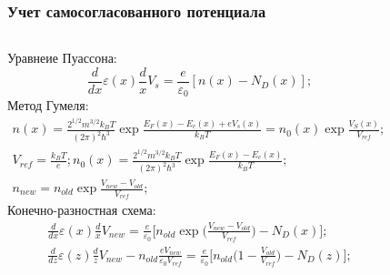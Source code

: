 \documentclass[10pt,pdf,hyperref={unicode},aspectratio={169}]{beamer}
\begin{document}
\begin{frame}
	\frametitle{Учет самосогласованного потенциала}

\begin{columns}
	{\color{blue}Уравнеие Пуассона:}
	{\tiny
	\begin{equation*}
		\frac{d}{dx}\varepsilon(x)\frac{d}{x}V_{s} = \frac{e}{\varepsilon_{0}}[n(x) - N_{D}(x)];
	\end{equation*}
	}
	{\color{red}Метод Гумеля:}
	{\tiny
	\begin{gather*}
		n(x) = \frac{2^{1/2}m^{3/2}k_{B}T}{(2\pi)^{2}\hbar^{3}} \exp \frac{E_{F}(x) - E_{c}(x) + eV_{s}(x)}{k_{B}T} =  n_{0}(x)\exp\frac{V_{S}(x)}{V_{ref}};\,\\
		V_{ref} = \frac{k_{B}T}{e}; n_{0}(x) = \frac{2^{1/2}m^{3/2}k_{B}T}{(2\pi)^{2}\hbar^{3}} \exp \frac{E_{F}(x) - E_{c}(x)}{k_{B}T};\\
		n_{new} = n_{old}\exp\frac{V_{new} - V_{old}}{V_{ref}};
	\end{gather*}}
	{\color{red}Конечно-разностная схема:}
	\tiny
	\begin{gather*}
		\frac{d}{dx}\varepsilon(x)\frac{d}{x}V_{new} = \frac{e}{\varepsilon_{0}}\bigg[n_{old}\exp\bigg( \frac{V_{new} - V_{old}}{V_{ref}} \bigg) - N_{D}(x)\bigg];\\
		\frac{d}{dz}\varepsilon(z)\frac{d}{z}V_{new} - n_{old}\frac{eV_{new}}{\varepsilon_{0}V_{ref}} = \frac{e}{\varepsilon_{0}}\bigg[n_{old}\bigg( 1 - \frac{V_{old}}{V_{ref}} \bigg) - N_{D}(z)\bigg];
	\end{gather*}


\end{columns}
\end{frame}
\end{document}
